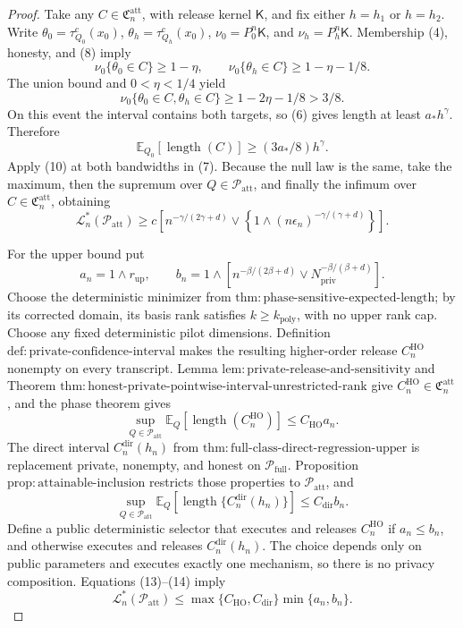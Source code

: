 \documentclass{article}
\begin{document}
\begin{proof}
Take any \(C\in\mathfrak C_n^{\mathrm{att}}\), with release kernel \(\mathsf K\), and fix either \(h=h_1\) or \(h=h_2\).  Write \(\theta_0=\tau_{Q_0}^{\mathrm c}(x_0)\), \(\theta_h=\tau_{Q_h}^{\mathrm c}(x_0)\), \(\nu_0=P_0^n\mathsf K\), and \(\nu_h=P_h^n\mathsf K\).  Membership (4), honesty, and (8) imply
\[
 \nu_0\{\theta_0\in C\}\ge1-\eta,
 \qquad
 \nu_0\{\theta_h\in C\}\ge1-\eta-1/8.
\]
The union bound and \(0<\eta<1/4\) yield
\[
 \nu_0\{\theta_0\in C,\theta_h\in C\}
 \ge1-2\eta-1/8>3/8.
\tag{9}
\]
On this event the interval contains both targets, so (6) gives length at least \(a_*h^\gamma\).  Therefore
\[
 \mathbb E_{Q_0}[\operatorname{length}(C)]\ge(3a_*/8)h^\gamma.
\tag{10}
\]
Apply (10) at both bandwidths in (7).  Because the null law is the same, take the maximum, then the supremum over \(Q\in\mathcal P_{\mathrm{att}}\), and finally the infimum over \(C\in\mathfrak C_n^{\mathrm{att}}\), obtaining
\[
 \mathcal L_n^*(\mathcal P_{\mathrm{att}})
 \ge c\left[n^{-\gamma/(2\gamma+d)}
 \vee\left\{1\wedge(n\epsilon_n)^{-\gamma/(\gamma+d)}\right\}\right].
\tag{11}
\]

For the upper bound put
\[
 a_n=1\wedge r_{\mathrm{up}},
 \qquad
 b_n=1\wedge\left[n^{-\beta/(2\beta+d)}
          \vee N_{\mathrm{priv}}^{-\beta/(\beta+d)}\right].
\tag{12}
\]
Choose the deterministic minimizer from \(\mathrm{thm{:}phase\text{-}sensitive\text{-}expected\text{-}length}\); by its corrected domain, its basis rank satisfies \(k\ge k_{\mathrm{poly}}\), with no upper rank cap.  Choose any fixed deterministic pilot dimensions.  Definition \(\mathrm{def{:}private\text{-}confidence\text{-}interval}\) makes the resulting higher-order release \(C_n^{\mathrm{HO}}\) nonempty on every transcript.  Lemma \(\mathrm{lem{:}private\text{-}release\text{-}and\text{-}sensitivity}\) and Theorem \(\mathrm{thm{:}honest\text{-}private\text{-}pointwise\text{-}interval\text{-}unrestricted\text{-}rank}\) give \(C_n^{\mathrm{HO}}\in\mathfrak C_n^{\mathrm{att}}\), and the phase theorem gives
\[
 \sup_{Q\in\mathcal P_{\mathrm{att}}}
 \mathbb E_Q[\operatorname{length}(C_n^{\mathrm{HO}})]
 \le C_{\mathrm{HO}}a_n.
\tag{13}
\]
The direct interval \(C_n^{\mathrm{dir}}(h_n)\) from \(\mathrm{thm{:}full\text{-}class\text{-}direct\text{-}regression\text{-}upper}\) is replacement private, nonempty, and honest on \(\mathcal P_{\mathrm{full}}\).  Proposition \(\mathrm{prop{:}attainable\text{-}inclusion}\) restricts those properties to \(\mathcal P_{\mathrm{att}}\), and
\[
 \sup_{Q\in\mathcal P_{\mathrm{att}}}
 \mathbb E_Q[\operatorname{length}\{C_n^{\mathrm{dir}}(h_n)\}]
 \le C_{\mathrm{dir}}b_n.
\tag{14}
\]
Define a public deterministic selector that executes and releases \(C_n^{\mathrm{HO}}\) if \(a_n\le b_n\), and otherwise executes and releases \(C_n^{\mathrm{dir}}(h_n)\).  The choice depends only on public parameters and executes exactly one mechanism, so there is no privacy composition.  Equations (13)--(14) imply
\[
 \mathcal L_n^*(\mathcal P_{\mathrm{att}})
 \le\max\{C_{\mathrm{HO}},C_{\mathrm{dir}}\}\min\{a_n,b_n\}.
\tag{15}
\]


\end{proof}
\end{document}
